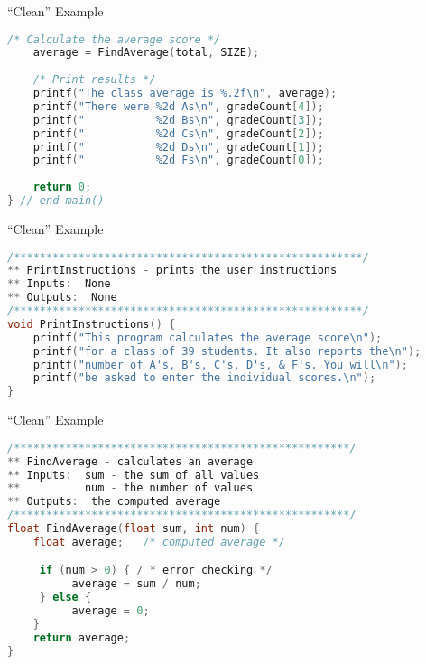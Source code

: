 \documentclass[graphics]{beamer}
\begin{document}
\begin{frame}[fragile]{``Clean'' Example}
    \begin{lstlisting}[language=C,basicstyle=\footnotesize,keywordstyle=\color{blue},commentstyle=\color{green},showstringspaces=false,stringstyle=\color{red}]
    /* Calculate the average score */
    average = FindAverage(total, SIZE);
    
    /* Print results */
    printf("The class average is %.2f\n", average);
    printf("There were %2d As\n", gradeCount[4]);
    printf("           %2d Bs\n", gradeCount[3]);
    printf("           %2d Cs\n", gradeCount[2]);
    printf("           %2d Ds\n", gradeCount[1]);
    printf("           %2d Fs\n", gradeCount[0]);
    
    return 0;
} // end main()
    \end{lstlisting}
\end{frame}

\begin{frame}[fragile]{``Clean'' Example}
    \begin{lstlisting}[language=C,basicstyle=\footnotesize,keywordstyle=\color{blue},commentstyle=\color{green},showstringspaces=false,stringstyle=\color{red}]
/******************************************************/
** PrintInstructions - prints the user instructions
** Inputs:  None
** Outputs:  None
/******************************************************/
void PrintInstructions() {
    printf("This program calculates the average score\n");
    printf("for a class of 39 students. It also reports the\n");
    printf("number of A's, B's, C's, D's, & F's. You will\n");
    printf("be asked to enter the individual scores.\n");
}
    \end{lstlisting}
\end{frame}


\begin{frame}[fragile]{``Clean'' Example}
    \begin{lstlisting}[language=C,basicstyle=\footnotesize,keywordstyle=\color{blue},commentstyle=\color{green},showstringspaces=false,stringstyle=\color{red}]
/****************************************************/
** FindAverage - calculates an average
** Inputs:  sum - the sum of all values
**          num - the number of values
** Outputs:  the computed average
/****************************************************/
float FindAverage(float sum, int num) {
    float average;   /* computed average */

     if (num > 0) { / * error checking */
          average = sum / num;
     } else {
          average = 0;
    }
    return average;
}
    \end{lstlisting}
\end{frame}
\end{document}
